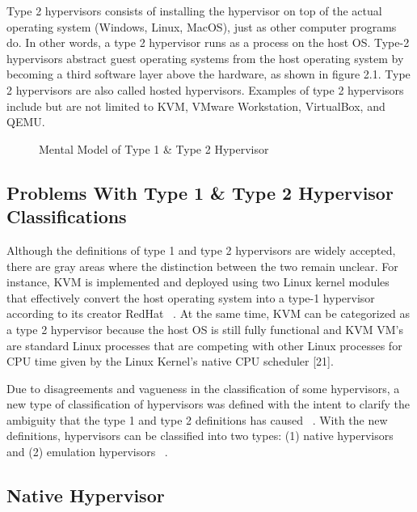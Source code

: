 \documentclass{report}
\begin{document}
\begin{spacing}{1.5}
{\large
Type 2 hypervisors consists of installing the hypervisor on top of the actual operating system (Windows, Linux, MacOS), just as other computer programs do. In other words, a type 2 hypervisor runs as a process on the host OS. Type-2 hypervisors abstract guest operating systems from the host operating system by becoming a third software layer above the hardware, as shown in figure 2.1. Type 2 hypervisors are also called hosted hypervisors. Examples of type 2 hypervisors include but are not limited to KVM, VMware Workstation, VirtualBox, and QEMU.
\newline
}


\begin{figure}[ht]
    \caption{Mental Model of Type 1 \& Type 2 Hypervisor}
\end{figure}


\subsection{Problems With Type 1 \& Type 2 Hypervisor Classifications}

{\large
Although the definitions of type 1 and type 2 hypervisors are widely accepted, there are gray areas where the distinction between the two remain unclear. For instance, KVM is implemented and deployed using two Linux kernel modules that effectively convert the host operating system into a type-1 hypervisor according to its creator RedHat ~\cite{graziano2011performance}. At the same time, KVM can be categorized as a type 2 hypervisor because the host OS is still fully functional and KVM VM's are standard Linux processes that are competing with other Linux processes for CPU time given by the Linux Kernel's native CPU scheduler [21].
\newline
}


{\large
Due to disagreements and vagueness in the classification of some hypervisors, a new type of classification of hypervisors was defined with the intent to clarify the ambiguity that the type 1 and type 2 definitions has caused ~\cite{10.1145/2775111}. With the new definitions, hypervisors can be classified into two types: (1) native hypervisors and (2) emulation hypervisors ~\cite{10.1145/2775111}.
\newline
}

\subsection{Native Hypervisor}


\end{spacing}
\end{document}

